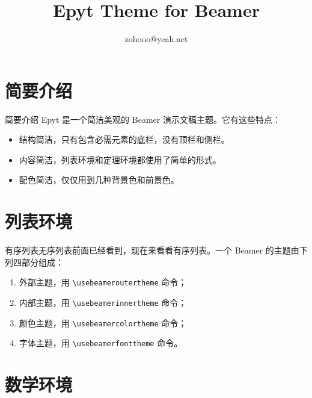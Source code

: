 \documentclass[14pt,notheorems]{beamer}
\title{Epyt Theme for Beamer}
\author{zohooo@yeah.net}
\begin{document}
\begin{frame}[plain]\transboxout
\titlepage
\end{frame}

\begin{frame}\transboxin
\begin{center}
\tableofcontents[hideallsubsections]
\end{center}
\end{frame}


\section{简要介绍}

\begin{frame}{简要介绍}\transdissolve
Epyt 是一个简洁美观的 Beamer 演示文稿主题。它有这些特点：\pause
\begin{itemize}[<+->]
\item 结构简洁，只有包含必需元素的底栏，没有顶栏和侧栏。
\item 内容简洁，列表环境和定理环境都使用了简单的形式。
\item 配色简洁，仅仅用到几种背景色和前景色。
\end{itemize}
\end{frame}


\section{列表环境}

\begin{frame}[fragile]{有序列表}\transwipe[direction=270]
无序列表前面已经看到，现在来看看有序列表。一个 Beamer 的主题由下列四部分组成：\pause
\begin{enumerate}[<+->]
\item 外部主题，用 \verb!\usebeameroutertheme! 命令；
\item 内部主题，用 \verb!\usebeamerinnertheme! 命令；
\item 颜色主题，用 \verb!\usebeamercolortheme! 命令；
\item 字体主题，用 \verb!\usebeamerfonttheme! 命令。
\end{enumerate}
\end{frame}


\section{数学环境}
\end{document}
